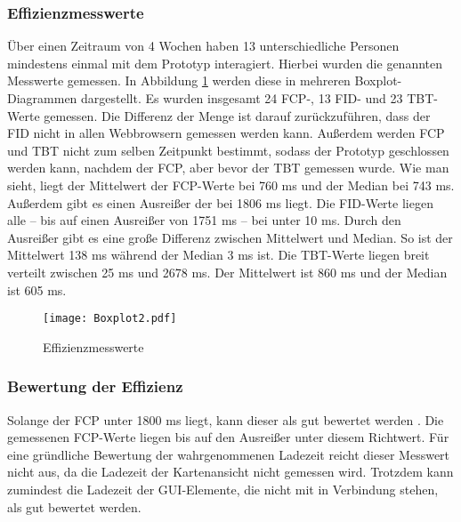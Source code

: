 
\subsubsection{Effizienzmesswerte}

Über einen Zeitraum von 4 Wochen haben 13 unterschiedliche Personen mindestens einmal mit dem Prototyp interagiert. Hierbei wurden die genannten Messwerte gemessen. In Abbildung \ref{fig:EfficiencyBoxplot} werden diese in mehreren Boxplot-Diagrammen dargestellt. Es wurden insgesamt 24 \ac{FCP}-, 13 \ac{FID}- und 23 \ac{TBT}-Werte gemessen. Die Differenz der Menge ist darauf zurückzuführen, dass der \ac{FID} nicht in allen Webbrowsern gemessen werden kann. Außerdem werden \ac{FCP} und \ac{TBT} nicht zum selben Zeitpunkt bestimmt, sodass der Prototyp geschlossen werden kann, nachdem der \ac{FCP}, aber bevor der \ac{TBT} gemessen wurde. Wie man sieht, liegt der Mittelwert der \ac{FCP}-Werte bei 760 ms und der Median bei 743 ms. Außerdem gibt es einen Ausreißer der bei 1806 ms liegt. Die \ac{FID}-Werte liegen alle – bis auf einen Ausreißer von 1751 ms – bei unter 10 ms. Durch den Ausreißer gibt es eine große Differenz zwischen Mittelwert und Median. So ist der Mittelwert 138 ms während der Median 3 ms ist. Die \ac{TBT}-Werte liegen breit verteilt zwischen 25 ms und 2678 ms. Der Mittelwert ist 860 ms und der Median ist 605 ms.

\begin{figure}[H]
    \caption{Effizienzmesswerte}\label{fig:EfficiencyBoxplot}
    \texttt{[image: Boxplot2.pdf]}
\end{figure}


\subsubsection{Bewertung der Effizienz}
Solange der \ac{FCP} unter 1800 ms liegt, kann dieser als gut bewertet werden \cite{FCP}. Die gemessenen \ac{FCP}-Werte liegen bis auf den Ausreißer unter diesem Richtwert. Für eine gründliche Bewertung der wahrgenommenen Ladezeit reicht dieser Messwert nicht aus, da die Ladezeit der Kartenansicht nicht gemessen wird. Trotzdem kann zumindest die Ladezeit der \ac{GUI}-Elemente, die nicht mit \deckgl{} in Verbindung stehen, als gut bewertet werden.

